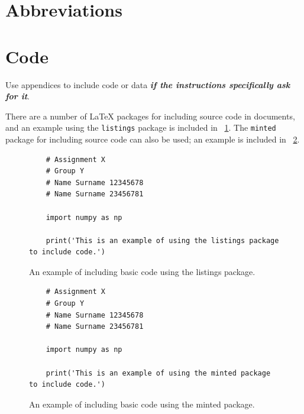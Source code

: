\documentclass[a4paper, onecolumn, 12pt]{IEEEtran}
\begin{document}
\FloatBarrier


\appendices


\section{Abbreviations}
\label{sec:abbreviations}


\section{Code}
\label{app:code}

Use appendices to include code or data \textbf{\textit{if the instructions specifically ask for it}}.

There are a number of \LaTeX{} packages for including source code in documents, and an example using the \verb|listings| package is included in \figurename~\ref{fig:code_listings}. The \verb|minted| package for including source code can also be used; an example is included in \figurename~\ref{fig:code_minted}.

\begin{figure}[htbp]
    \centering
    \begin{lstlisting}
    # Assignment X
    # Group Y
    # Name Surname 12345678
    # Name Surname 23456781
    
    import numpy as np
    
    print('This is an example of using the listings package to include code.')
    \end{lstlisting}
    \caption{An example of including basic code using the listings package.}
    \label{fig:code_listings}
\end{figure}

\begin{figure}[htbp]
    \centering
    \begin{verbatim}
    # Assignment X
    # Group Y
    # Name Surname 12345678
    # Name Surname 23456781
    
    import numpy as np
    
    print('This is an example of using the minted package to include code.')
    \end{verbatim}
    \caption{An example of including basic code using the minted package.}
    \label{fig:code_minted}
\end{figure}
\end{document}
